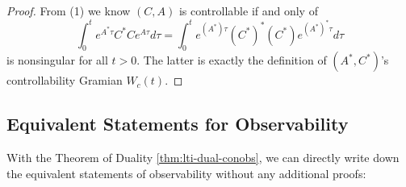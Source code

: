\documentclass[
]{book}
\theoremstyle{definition}
\theoremstyle{definition}
\theoremstyle{definition}
\theoremstyle{definition}
\theoremstyle{remark}
\begin{document}
\begin{proof}
From (1) we know \((C,A)\) is controllable if and only of
\begin{equation*}
   \int_{0}^{t} e^{A^*\tau} C^*C e^{A\tau} d\tau = \int_{0}^{t} e^{(A^*)\tau} (C^*)^* (C^*) e^{(A^*)^*\tau} d\tau
\end{equation*}
is nonsingular for all \(t >0\). The latter is exactly the definition of \((A^*, C^*)\)'s controllability Gramian \(W_c(t)\).

\end{proof}

\subsection{Equivalent Statements for Observability}\label{equivalent-statements-for-observability}

With the Theorem of Duality \ref{thm:lti-dual-conobs}, we can directly write down the equivalent statements of observability without any additional proofs:
\end{document}
